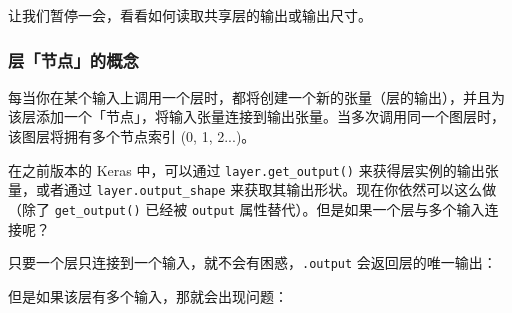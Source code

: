 让我们暂停一会，看看如何读取共享层的输出或输出尺寸。


\subsubsection{层「节点」的概念}\label{ux5c42ux8282ux70b9ux7684ux6982ux5ff5}

每当你在某个输入上调用一个层时，都将创建一个新的张量（层的输出），并且为该层添加一个「节点」，将输入张量连接到输出张量。当多次调用同一个图层时，该图层将拥有多个节点索引
(0, 1, 2...)。

在之前版本的 Keras 中，可以通过 \texttt{layer.get\_output()}
来获得层实例的输出张量，或者通过 \texttt{layer.output\_shape}
来获取其输出形状。现在你依然可以这么做（除了 \texttt{get\_output()}
已经被 \texttt{output} 属性替代）。但是如果一个层与多个输入连接呢？

只要一个层只连接到一个输入，就不会有困惑，\texttt{.output}
会返回层的唯一输出：

\begin{Shaded}
\begin{Highlighting}[]
\OperatorTok{=} \OperatorTok{=}\NormalTok{(}\NormalTok{, }\NormalTok{))}

\OperatorTok{=} \NormalTok{)}
\OperatorTok{=} 

 \OperatorTok{==} 
\end{Highlighting}
\end{Shaded}

但是如果该层有多个输入，那就会出现问题：

\begin{Shaded}
\begin{Highlighting}[]
\OperatorTok{=} \OperatorTok{=}\NormalTok{(}\NormalTok{, }\NormalTok{))}
\OperatorTok{=} \OperatorTok{=}\NormalTok{(}\NormalTok{, }\NormalTok{))}

\OperatorTok{=} \NormalTok{)}
\OperatorTok{=} 
\OperatorTok{=} 

\end{Highlighting}
\end{Shaded}

